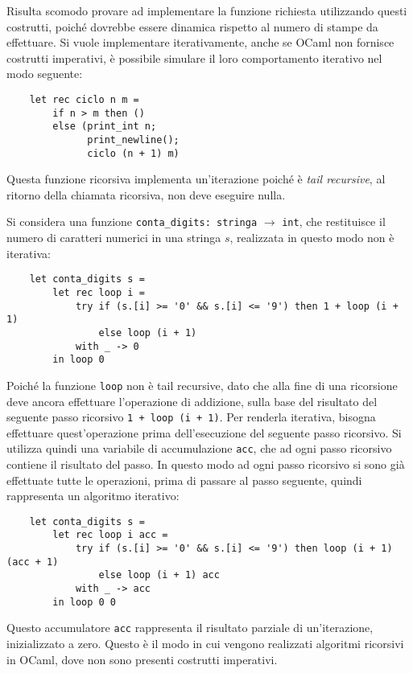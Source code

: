 \documentclass{article}
\numberwithin{equation}{subsection}
\begin{document}
Risulta scomodo provare ad implementare la funzione richiesta utilizzando questi costrutti, poiché dovrebbe essere dinamica rispetto al numero di stampe da effettuare. Si vuole implementare iterativamente, anche se OCaml non fornisce costrutti imperativi, è possibile simulare il loro comportamento iterativo nel modo seguente:
\begin{verbatim}
    let rec ciclo n m =
        if n > m then ()
        else (print_int n;
              print_newline();
              ciclo (n + 1) m)    
\end{verbatim}
Questa funzione ricorsiva implementa un'iterazione poiché è \textit{tail recursive}, al ritorno della chiamata ricorsiva, non deve eseguire nulla. 

Si considera una funzione \verb|conta_digits: stringa| $\rightarrow$ \verb|int|, che restituisce il numero di caratteri numerici in una stringa $s$, realizzata in questo modo non è iterativa:
\begin{verbatim}
    let conta_digits s =
        let rec loop i =
            try if (s.[i] >= '0' && s.[i] <= '9') then 1 + loop (i + 1)
                else loop (i + 1)
            with _ -> 0
        in loop 0    
\end{verbatim}
Poiché la funzione \verb|loop| non è tail recursive, dato che alla fine di una ricorsione deve ancora effettuare l'operazione di addizione, sulla base del risultato del seguente passo ricorsivo \verb|1 + loop (i + 1)|. Per renderla iterativa, bisogna effettuare quest'operazione prima dell'esecuzione del seguente passo ricorsivo. Si utilizza quindi una variabile di accumulazione \verb|acc|, che ad ogni passo ricorsivo contiene il risultato del passo. In questo modo ad ogni passo ricorsivo si sono già effettuate tutte le operazioni, prima di passare al passo seguente, quindi rappresenta un algoritmo iterativo:
\begin{verbatim}
    let conta_digits s =
        let rec loop i acc =
            try if (s.[i] >= '0' && s.[i] <= '9') then loop (i + 1) (acc + 1)
                else loop (i + 1) acc
            with _ -> acc
        in loop 0 0    
\end{verbatim}
Questo accumulatore \verb|acc| rappresenta il risultato parziale di un'iterazione, inizializzato a zero. Questo è il modo in cui vengono realizzati algoritmi ricorsivi in OCaml, dove non sono presenti costrutti imperativi. 
\end{document}

